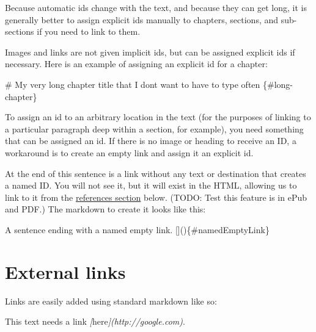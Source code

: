 \documentclass[
  english,
]{book}
\newenvironment{Shaded}{\begin{snugshade}}{\end{snugshade}}
\newcommand{\CommentTok}[1]{\textcolor[rgb]{0.56,0.35,0.01}{\textit{#1}}}
\newcommand{\FunctionTok}[1]{\textcolor[rgb]{0.00,0.00,0.00}{#1}}
\newcommand{\NormalTok}[1]{#1}
\newcommand{\OtherTok}[1]{\textcolor[rgb]{0.56,0.35,0.01}{#1}}
\begin{document}
Because automatic ids change with the text, and because they can get long, it is generally better to assign explicit ids manually to chapters, sections, and sub-sections if you need to link to them.

Images and links are not given implicit ids, but can be assigned explicit ids if necessary. Here is an example of assigning an explicit id for a chapter:

\begin{Shaded}
\begin{Highlighting}[]
\FunctionTok{\# My very long chapter title that I don\textquotesingle{}t want to have to type often \{\#long{-}chapter\}}
\end{Highlighting}
\end{Shaded}

To assign an id to an arbitrary location in the text (for the purposes of linking to a particular paragraph deep within a section, for example), you need something that can be assigned an id. If there is no image or heading to receive an ID, a workaround is to create an empty link and assign it an explicit id.

At the end of this sentence is a link without any text or destination that creates a named ID. \protect\hypertarget{namedEmptyLink}{\href{}{}} You will not see it, but it will exist in the HTML, allowing us to link to it from the \protect\hyperlink{references}{references section} below. (TODO: Test this feature is in ePub and PDF.) The markdown to create it looks like this:

\begin{Shaded}
\begin{Highlighting}[]
\NormalTok{A sentence ending with a named empty link. []()\{\#namedEmptyLink\}}
\end{Highlighting}
\end{Shaded}

\hypertarget{external-links}{%
\section{External links}\label{external-links}}

Links are easily added using standard markdown like so:

\begin{Shaded}
\begin{Highlighting}[]
\NormalTok{This text needs a link }\CommentTok{[}\OtherTok{here}\CommentTok{](http://google.com)}\NormalTok{.}
\end{Highlighting}
\end{Shaded}
\end{document}
